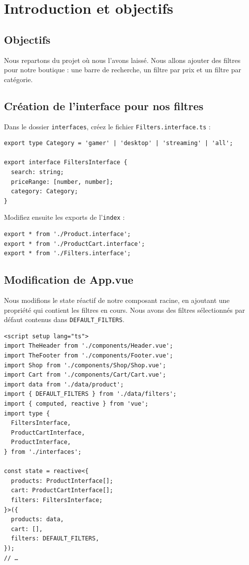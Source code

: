 \section{ Introduction et objectifs}
\subsection{Objectifs}
Nous repartons du projet où nous l'avons laissé. Nous allons ajouter des filtres pour notre boutique : une barre de recherche, un filtre par prix et un filtre par catégorie.

\subsection{Création de l'interface pour nos filtres}
Dans le dossier {\tt interfaces}, créez le fichier {\tt Filters.interface.ts} :
\begin{verbatim}
export type Category = 'gamer' | 'desktop' | 'streaming' | 'all';

export interface FiltersInterface {
  search: string;
  priceRange: [number, number];
  category: Category;
}
\end{verbatim}
Modifiez ensuite les {\color{monOrange}exports} de l'{\tt index} :
\begin{verbatim}
export * from './Product.interface';
export * from './ProductCart.interface';
export * from './Filters.interface';
\end{verbatim}
\subsection{Modification de {\color{monOrange}App.vue}}
Nous modifions le {\color{monOrange}state} réactif de notre composant racine, en ajoutant une propriété qui contient les filtres en cours. Nous avons des filtres sélectionnés par défaut contenus dans {\tt DEFAULT\_FILTERS}.
\begin{verbatim}
<script setup lang="ts">
import TheHeader from './components/Header.vue';
import TheFooter from './components/Footer.vue';
import Shop from './components/Shop/Shop.vue';
import Cart from './components/Cart/Cart.vue';
import data from './data/product';
import { DEFAULT_FILTERS } from './data/filters';
import { computed, reactive } from 'vue';
import type {
  FiltersInterface,
  ProductCartInterface,
  ProductInterface,
} from './interfaces';

const state = reactive<{
  products: ProductInterface[];
  cart: ProductCartInterface[];
  filters: FiltersInterface;
}>({
  products: data,
  cart: [],
  filters: DEFAULT_FILTERS,
});
// …
\end{verbatim}
